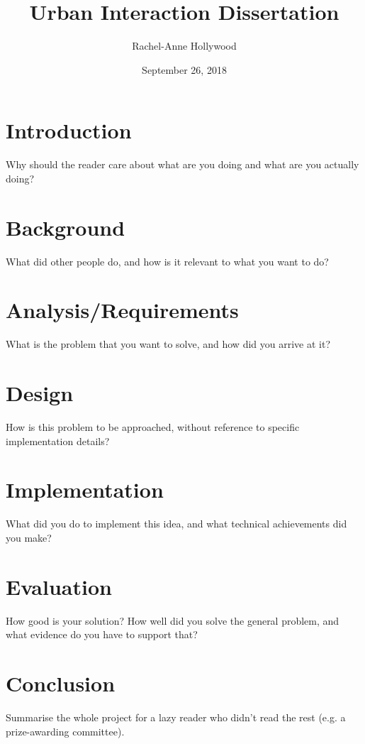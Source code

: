 \documentclass{dissertation}
\begin{document}
\title{Urban Interaction Dissertation}
\author{Rachel-Anne Hollywood}
\date{September 26, 2018}

\maketitle

\begin{abstract}
  
\end{abstract}


\def\consentname {Rachel-Anne Hollywood}
\def\consentdate {26 September 2018}

\educationalconsent



\tableofcontents

\chapter{Introduction}



Why should the reader care about what are you doing and what are you actually doing?



\chapter{Background}
What did other people do, and how is it relevant to what you want to do?


\chapter{Analysis/Requirements}
What is the problem that you want to solve, and how did you arrive at it?
 


\chapter{Design}
How is this problem to be approached, without reference to specific implementation details? 

\chapter{Implementation}
What did you do to implement this idea, and what technical achievements did you make?


\clearpage

\chapter{Evaluation} 
How good is your solution? How well did you solve the general problem, and what evidence do you have to support that?



\chapter{Conclusion}    
Summarise the whole project for a lazy reader who didn't read the rest (e.g. a prize-awarding committee).
\end{document}
